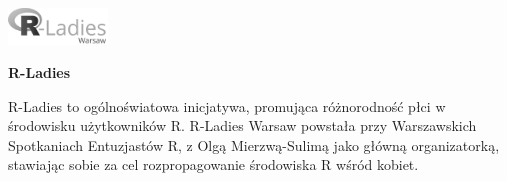 \documentclass[\main/boa.tex]{subfiles}
\begin{document}
	
	\begin{minipage}[t]{0.915\textwidth}
		\center     
		\includegraphics[width=100px]{img/logos.bw/R-Ladies.png} 
	\end{minipage}
	
	\Large \textbf {R-Ladies}
	
	
	\vskip 0.3cm
	\normalsize 
	R-Ladies to ogólnoświatowa inicjatywa, promująca różnorodność płci w środowisku użytkowników R. R-Ladies Warsaw powstała przy Warszawskich Spotkaniach Entuzjastów R, z Olgą Mierzwą-Sulimą jako główną organizatorką, stawiając sobie za cel rozpropagowanie środowiska R wśród kobiet.
\end{document}
